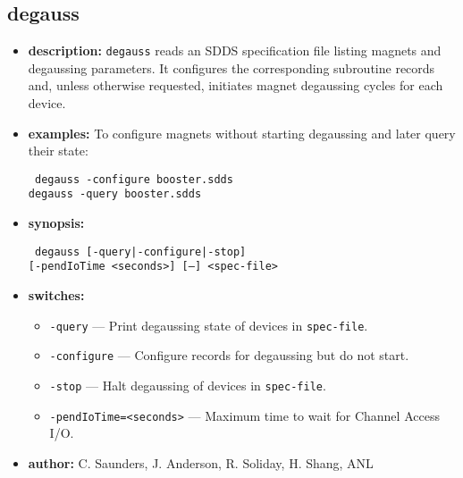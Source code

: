 \begin{latexonly}
\newpage
\end{latexonly}
\subsection{degauss}
\label{degauss}

\begin{itemize}
\item {\bf description:}
\verb+degauss+ reads an SDDS specification file listing magnets and degaussing parameters.
It configures the corresponding subroutine records and, unless otherwise requested, initiates
magnet degaussing cycles for each device.
\item {\bf examples:}
To configure magnets without starting degaussing and later query their state:
\begin{flushleft}{\tt
  degauss -configure booster.sdds\\
  degauss -query booster.sdds
}\end{flushleft}
\item {\bf synopsis:}
  \begin{flushleft}{\tt
    degauss [-query|-configure|-stop]\\
    \phantom{degauss }[-pendIoTime <seconds>] [--] <spec-file>
  }\end{flushleft}
\item {\bf switches:}
  \begin{itemize}
    \item {\tt -query} --- Print degaussing state of devices in {\tt spec-file}.
    \item {\tt -configure} --- Configure records for degaussing but do not start.
    \item {\tt -stop} --- Halt degaussing of devices in {\tt spec-file}.
    \item {\tt -pendIoTime=<seconds>} --- Maximum time to wait for Channel Access I/O.
  \end{itemize}
\item {\bf author:} C. Saunders, J. Anderson, R. Soliday, H. Shang, ANL
\end{itemize}
